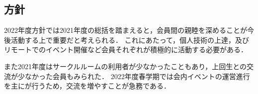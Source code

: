 \subsection*{\newGradeIfKouki{}\secondGrade{}方針}

2022年度\newGradeIfKouki{}\secondGrade{}方針では2021年度の総括を踏まえると，会員間の親睦を深めることが今後活動する上で重要だと考えられる．
これにあたって，個人技術の上達，及びリモートでのイベント開催など会員それぞれが積極的に活動する必要がある．

また2021年度はサークルルームの利用者が少なかったこともあり，上回生との交流が少なかった会員もみられた．
2022年度春学期では会内イベントの運営進行を主に\secondGrade{}が行うため，交流を増やすことが急務である．
